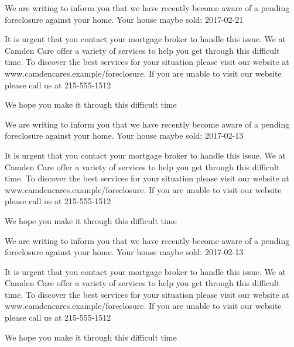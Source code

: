 \documentclass[10pt,stdletter]{newlfm}
\begin{document}
\pagebreak
{}
\begin{newlfm}

We are writing to inform you that we have recently become aware of a pending foreclosure against your home. Your house maybe sold: 2017-02-21

It is urgent that you contact your mortgage broker to handle this issue.
We at Camden Care offer a variety of services to help you get through this difficult time. To discover the best services for your situation please visit our website at www.camdencares.example/foreclosure.
If you are unable to visit our website please call us at 215-555-1512

We hope you make it through this difficult time

\end{newlfm}
\pagebreak
{}
\begin{newlfm}

We are writing to inform you that we have recently become aware of a pending foreclosure against your home. Your house maybe sold: 2017-02-13

It is urgent that you contact your mortgage broker to handle this issue.
We at Camden Care offer a variety of services to help you get through this difficult time. To discover the best services for your situation please visit our website at www.camdencares.example/foreclosure.
If you are unable to visit our website please call us at 215-555-1512

We hope you make it through this difficult time

\end{newlfm}
\pagebreak
{}
\begin{newlfm}

We are writing to inform you that we have recently become aware of a pending foreclosure against your home. Your house maybe sold: 2017-02-13

It is urgent that you contact your mortgage broker to handle this issue.
We at Camden Care offer a variety of services to help you get through this difficult time. To discover the best services for your situation please visit our website at www.camdencares.example/foreclosure.
If you are unable to visit our website please call us at 215-555-1512

We hope you make it through this difficult time

\end{newlfm}
\pagebreak
\end{document}
